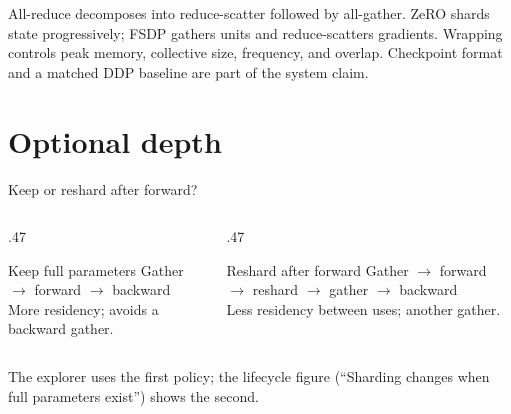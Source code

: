 \documentclass[handout]{beamer}
\begin{document}
\takeaways
{All-reduce decomposes into reduce-scatter followed by all-gather.}
{ZeRO shards state progressively; FSDP gathers units and reduce-scatters gradients.}
{Wrapping controls peak memory, collective size, frequency, and overlap.}
{Checkpoint format and a matched DDP baseline are part of the system claim.}
\appendix
\section{Optional depth}
\begin{frame}{Keep or reshard after forward?}
  \begin{columns}[t]
    \begin{column}{.47\linewidth}
      \begin{block}{Keep full parameters}
        Gather $\to$ forward $\to$ backward\\[5pt]
        More residency; avoids a backward gather.
      \end{block}
    \end{column}
    \begin{column}{.47\linewidth}
      \begin{alertblock}{Reshard after forward}
        Gather $\to$ forward $\to$ reshard $\to$ gather $\to$ backward\\[5pt]
        Less residency between uses; another gather.
      \end{alertblock}
    \end{column}
  \end{columns}
  \vfill
  \small The explorer uses the first policy; the lifecycle figure (``Sharding changes when full parameters exist'') shows the second.
\end{frame}
\end{document}

